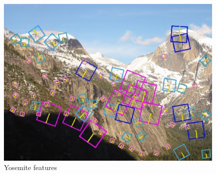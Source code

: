 \documentclass[10pt,twocolumn,letterpaper]{article}
\begin{document}
\begin{figure}[ht!]
\centering
\includegraphics[width=1\textwidth]{img/Yosemite1_features.eps}
\caption{Yosemite features}
\label{fig:yosemite_feat}
\end{figure}

{\small


}
\end{document}
